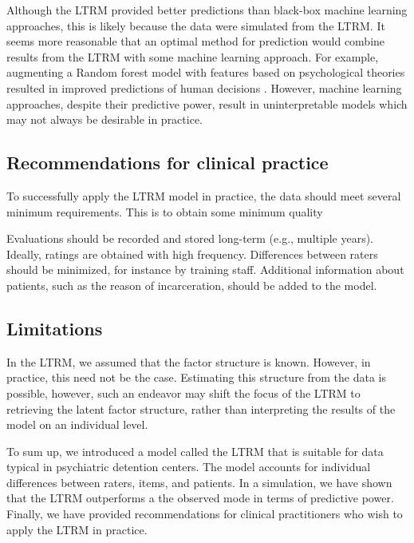 \documentclass{article}
\begin{document}
Although the LTRM provided better predictions than black-box machine learning approaches, this is likely because the data were simulated from the LTRM. It seems more reasonable that an optimal method for prediction would combine results from the LTRM with some machine learning approach. For example, augmenting a Random forest model with features based on psychological theories resulted in improved predictions of human decisions \cite{plonsky2019predicting, plonsky2017psychological}. However, machine learning approaches, despite their predictive power, result in uninterpretable models which may not always be desirable in practice.

\subsection*{Recommendations for clinical practice}
To successfully apply the LTRM model in practice, the data should meet several minimum requirements. This is to obtain some minimum quality

Evaluations should be recorded and stored long-term (e.g., multiple years). Ideally, ratings are obtained with high frequency. Differences between raters should be minimized, for instance by training staff. Additional information about patients, such as the reason of incarceration, should be added to the model.


\subsection*{Limitations}

In the LTRM, we assumed that the factor structure is known. However, in practice, this need not be the case. Estimating this structure from the data is possible, however, such an endeavor may shift the focus of the LTRM to retrieving the latent factor structure, rather than interpreting the results of the model on an individual level.

To sum up, we introduced a model called the LTRM that is suitable for data typical in psychiatric detention centers. The model accounts for individual differences between raters, items, and patients. In a simulation, we have shown that the LTRM outperforms a the observed mode in terms of predictive power. Finally, we have provided recommendations for clinical practitioners who wish to apply the LTRM in practice. 





\newpage
\appendix
\end{document}
